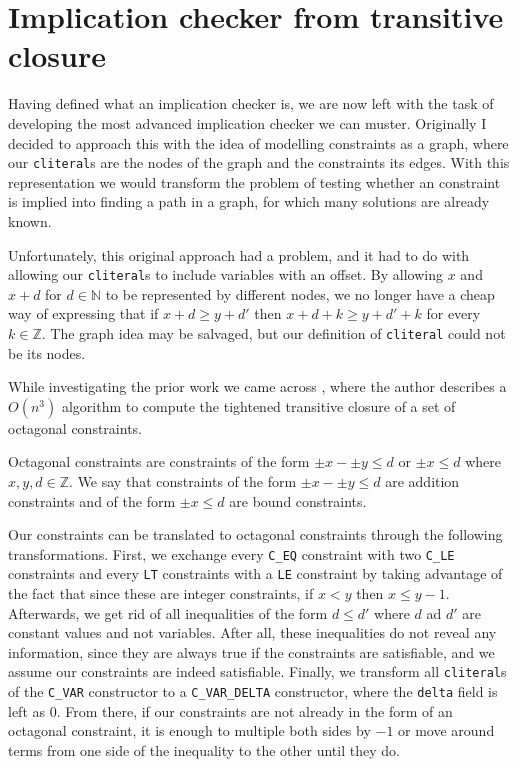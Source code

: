 \chapter{Implication checker from transitive closure}
\label{cap:basic-definitions}

Having defined what an implication checker is, we are now left with the task of
developing the most advanced implication checker we can muster. Originally I
decided to approach this with the idea of modelling constraints as a graph, where
our \texttt{cliteral}s are the nodes of the graph and the constraints its edges. With 
this representation we would transform the problem of testing whether an constraint is
implied into finding a path in a graph, for which many solutions are already 
known.

Unfortunately, this original approach had a problem, and it had to do with 
allowing our \texttt{cliteral}s to include variables with an offset.
By allowing $x$ and $x + d$ for $d \in \mathbb{N}$ to be represented by 
different nodes, we no longer have a cheap way of expressing that if $x + d \ge y + d'$ then $x + d + k \ge y + d' + k$ for every $k\in \mathbb{Z}$. The graph
idea may be salvaged, but our definition of \texttt{cliteral} could not be
its nodes.

While investigating the prior work we came across \cite{TransitiveClosure}, where
the author describes a $O(n^3)$ algorithm to compute the tightened transitive 
closure of a set of octagonal constraints.

Octagonal constraints are constraints of the form $\pm x - \pm y \le d$ or 
$\pm x \le d$ where $x,y,d \in \mathbb{Z}$. We say that constraints of the form
$\pm x - \pm y \le d$ are addition constraints and of the form $\pm x \le d$ are
bound constraints.

Our constraints can be translated to octagonal constraints through the following 
transformations. First, we exchange every \texttt{C_EQ} constraint with two
\texttt{C_LE} constraints and every \texttt{LT} constraints with a 
\texttt{LE} constraint by taking advantage of the fact that since these are 
integer constraints, if $x < y$ then $x \le y-1$. Afterwards, we get rid of all 
inequalities of the form $d \le d'$ where $d$ ad $d'$ are constant values and not
variables. After all, these inequalities do not reveal any information, since they
are always true if the constraints are satisfiable, and we assume our constraints
are indeed satisfiable. Finally, we transform all \texttt{cliteral}s of the
\texttt{C_VAR} constructor to a \texttt{C_VAR_DELTA} constructor, where
the \texttt{delta} field is left as 0. From there, if our constraints are not
already in the form of an octagonal constraint, it is enough to multiple both sides
by $-1$ or move around terms from one side of the inequality to the other until 
they do.

